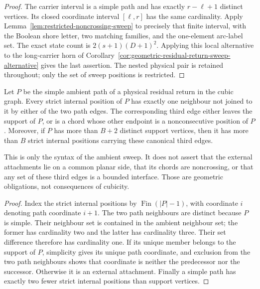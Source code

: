 \begin{proof}
The carrier interval is a simple path and has exactly $r-\ell+1$ distinct
vertices.  Its closed coordinate interval $[\ell,r]$ has the same
cardinality.  Apply Lemma~\ref{lem:restricted-noncrossing-sweep} to precisely
that finite interval, with the Boolean shore letter, two matching families,
and the one-element arc-label set.  The exact state count is
$2(s+1)(D+1)^2$.  Applying this local alternative to the long-carrier horn
of Corollary~\ref{cor:geometric-residual-return-sweep-alternative} gives the
last assertion.  The nested physical pair is retained throughout; only the
set of sweep positions is restricted.
\end{proof}

\begin{lemma}
\label{lem:ambient-return-third-edge-classification}
Let $P$ be the simple ambient path of a physical residual return in the cubic
graph.  Every strict internal position of $P$ has exactly one neighbour not
joined to it by either of the two path edges.  The corresponding third edge
either leaves the support of $P$, or is a chord whose other endpoint is a
nonconsecutive position of $P$.  Moreover, if $P$ has more than $B+2$
distinct support vertices, then it has more than $B$ strict internal
positions carrying these canonical third edges.

This is only the syntax of the ambient sweep.  It does not assert that the
external attachments lie on a common planar side, that its chords are
noncrossing, or that any set of these third edges is a bounded interface.
Those are geometric obligations, not consequences of cubicity.
\end{lemma}

\begin{proof}
Index the strict internal positions by
$\operatorname{Fin}(|P|-1)$, with coordinate $i$ denoting path coordinate
$i+1$.  The two path neighbours are distinct because $P$ is simple.  Their
neighbour set is contained in the ambient neighbour set; the former has
cardinality two and the latter has cardinality three.  Their set difference
therefore has cardinality one.  If its unique member belongs to the support
of $P$, simplicity gives its unique path coordinate, and exclusion from the
two path neighbours shows that coordinate is neither the predecessor nor the
successor.  Otherwise it is an external attachment.  Finally a simple path
has exactly two fewer strict internal positions than support vertices.
\end{proof}

